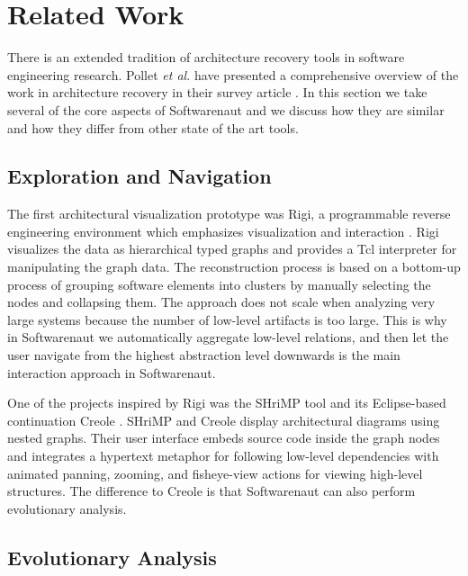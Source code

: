 \documentclass[preprint,12pt]{elsarticle}
\newcommand{\etal}{\emph{et al.}\xspace}
\begin{document}
\section {Related Work} \label {sec:rel}

There is an extended tradition of architecture recovery tools in software engineering research. Pollet \etal have presented a comprehensive overview of the work in architecture recovery in their survey article \cite{pollet-sar}. In this section we take several of the core aspects of Softwarenaut and we discuss how they are similar and how they differ from other state of the art tools.

\subsection {Exploration and Navigation} 

The first architectural visualization prototype was Rigi, a programmable reverse engineering environment which emphasizes visualization and interaction \cite{muller-revengenv}. Rigi  visualizes the data as hierarchical typed graphs and provides a Tcl interpreter for manipulating the graph data. The reconstruction process is based on a bottom-up process of grouping  software elements into clusters by manually selecting the nodes and collapsing them. The approach does not scale when analyzing very large systems because the number of low-level artifacts is too large. This is why in Softwarenaut we automatically aggregate low-level relations, and then let the user navigate from the highest abstraction level downwards is the main interaction approach in Softwarenaut. 

One of the projects inspired by Rigi was the SHriMP tool \cite{storey-shrimp} and its Eclipse-based continuation Creole \cite{lintern-creole}. SHriMP and Creole display architectural diagrams using nested graphs. Their user interface embeds source code inside the graph nodes and integrates a hypertext metaphor for following low-level dependencies with animated panning, zooming, and fisheye-view actions for viewing high-level structures. The difference to Creole is that Softwarenaut can also perform evolutionary analysis.


\subsection {Evolutionary Analysis}
 
\end{document}
